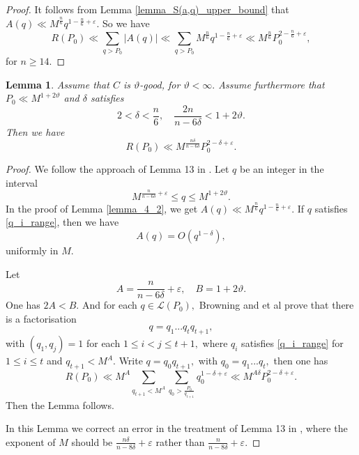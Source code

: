 \documentclass[12pt]{amsart}
\newtheorem{lemma}[theorem]{Lemma}
\theoremstyle{definition}
\numberwithin{equation}{section}
\begin{document}
\begin{proof}
It follows from Lemma \ref{lemma_S(a,q)_upper_bound} that $A(q) \ll M^{\frac{n}{6}}q^{1-\frac{n}{6}+\varepsilon}.$ So we have
\begin{equation*}
    R(P_0) \ll \sum_{q> P_0}|A(q)| \ll \sum_{q> P_0}M^{\frac{n}{6}}q^{1-\frac{n}{6}+\varepsilon} \ll M^{\frac{n}{6}}P_0^{2-\frac{n}{6}+\varepsilon},
\end{equation*}
for $n\geq 14.$
\end{proof}

\begin{lemma}
    Assume that $C$ is $\vartheta$-good, for $\vartheta < \infty.$ Assume furthermore that $P_0 \ll M^{1+2\vartheta}$ and $\delta$ satisfies
    \begin{equation}
        \label{delta_condition}
        2<\delta<\frac{n}{6}, \quad \frac{2n}{n-6\delta}<1+2\vartheta.
    \end{equation}
    Then we have
    \begin{equation*}
        R(P_0) \ll M^{\frac{n\delta}{n-6\delta}}P_0^{2-\delta+\varepsilon}.
    \end{equation*}
\end{lemma}

\begin{proof}
We follow the approach of Lemma 13 in \cite{browning2009least}. Let $q$ be an integer in the interval
\begin{equation}
\label{q_i_range}
    M^{\frac{n}{n-6\delta}+\varepsilon} \leq q \leq M^{1+2\vartheta}.
\end{equation}
In the proof of Lemma \ref{lemma_4_2}, we get $A(q) \ll M^{\frac{n}{6}}q^{1-\frac{n}{6}+\varepsilon}.$ If $q$ satisfies \eqref{q_i_range}, then we have 
\begin{equation*}
    A(q)=O(q^{1-\delta}),
\end{equation*}
uniformly in $M.$

Let
\begin{equation*}
    A= \frac{n}{n-6\delta}+\varepsilon,\quad B=1+2\vartheta.
\end{equation*}
One has $2A <B.$ And for each $q \in \mathscr{L}(P_0),$ Browning and et al \cite{browning2009least} prove that there is a factorisation
\begin{equation*}
    q=q_1...q_tq_{t+1},
\end{equation*}
with $(q_1, q_j)=1$ for each $1 \leq i < j \leq t+1,$ where $q_i$ satisfies \eqref{q_i_range} for $1 \leq i \leq t$ and $q_{t+1}< M^{A}.$ Write $q=q_0q_{t+1},$ with $q_0=q_1...q_t,$ then one has
\begin{equation*}
    R(P_0) \ll M^A \sum_{q_{t+1}<M^A}\sum_{q_0>\frac{P_0}{q_{t+1}}}q_0^{1-\delta+\varepsilon} \ll M^{A\delta}P_0^{2-\delta+\varepsilon}.
\end{equation*}
Then the Lemma follows.

In this Lemma we correct an error in the treatment of Lemma 13 in \cite{browning2009least}, where the exponent of $M$ should be $\frac{n\delta}{n-8\delta}+\varepsilon$ rather than $\frac{n}{n-8\delta}+\varepsilon.$
\end{proof}
\end{document}

